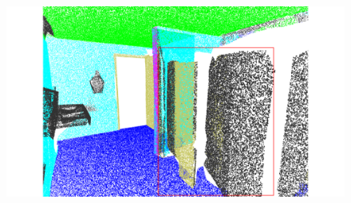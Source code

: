 \begin{figure}[htbp]
\begin{minipage}{0.22\textwidth}
    \end{minipage}
    \hfill
    \begin{minipage}{0.22\textwidth}
        \centering
        \includegraphics[width=\textwidth]{fig/supplement/semantic_segmentation/wc_2/PT_wc_2.pdf}
    \end{minipage}
    \hfill

    \vspace{0.5em}


\end{figure}
